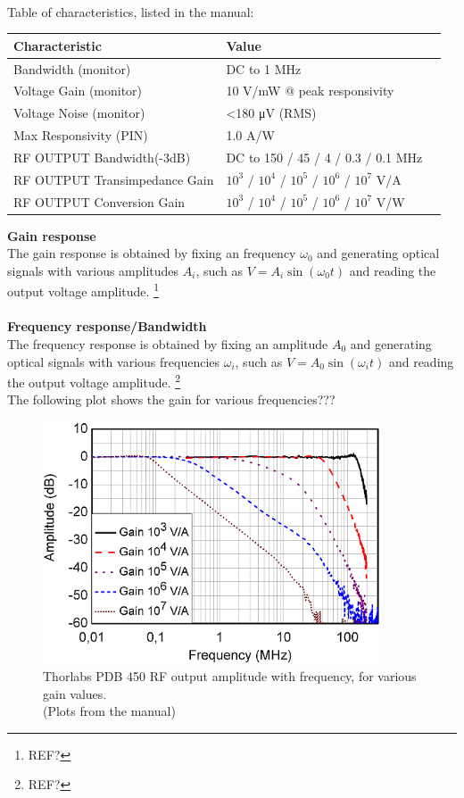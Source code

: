 \begin{bibunit}[plain]
\\
Table of characteristics, listed in the manual:
\begin{table}[H]
	\centering
	\begin{tabulary}{1.0\textwidth}{|L|L|l|}
		\hline
		\textbf{Characteristic}			& \textbf{Value}\\
		\hline
		Bandwidth (monitor)				& DC to 1 MHz\\
		\hline
		Voltage Gain (monitor)			& 10 V/mW @ peak responsivity\\
		\hline
		Voltage Noise (monitor)			& <180 μV (RMS)\\
		\hline
		Max Responsivity (PIN)			& 1.0 A/W\\
		\hline
		RF OUTPUT Bandwidth(-3dB)		& DC to 150 / 45 / 4 / 0.3 / 0.1 MHz\\
		\hline
		RF OUTPUT Transimpedance Gain	& $10^3$ / $10^4$ / $10^5$ / $10^6$ / $10^7$ V/A\\
		\hline
		RF OUTPUT Conversion Gain		& $10^3$ / $10^4$ / $10^5$ / $10^6$ / $10^7$ V/W\\
		\hline
	\end{tabulary}
\end{table}
\noindent
{\bf Gain response}\\
The gain response is obtained by fixing an frequency $\omega_0$ and generating optical signals with various amplitudes $A_i$, such as $V = A_i \sin \left( \omega_0 t \right)$ and reading the output voltage amplitude.
\footnote{REF?}\\
\\
{\bf Frequency response/Bandwidth}\\
The frequency response is obtained by fixing an amplitude $A_0$ and generating  optical signals with various frequencies $\omega_i$, such as $V = A_0 \sin \left( \omega_i t \right)$ and reading the output voltage amplitude.
\footnote{REF?}
\\
The following plot shows the gain for various frequencies???
\begin{figure}[H]
	\centering
	\includegraphics[width=10cm]{./sdf/optical_detection/figures/thorlabs-manual-gain-spec-rf.png}
	\caption{Thorlabs PDB 450 RF output amplitude with frequency, for various gain values.\\(Plots from the manual)}
\end{figure}

\end{bibunit}
